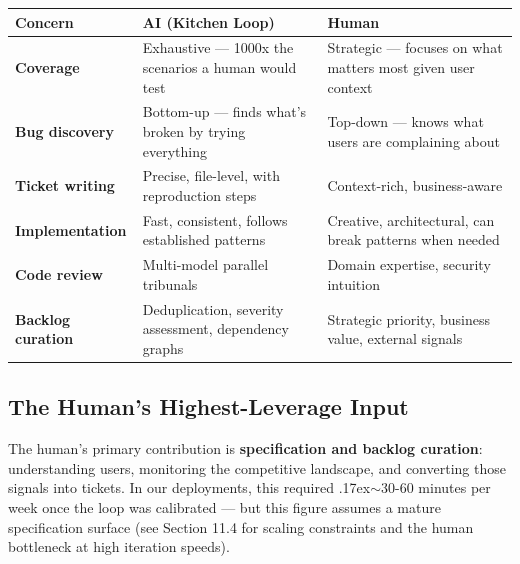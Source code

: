 \documentclass[11pt,a4paper]{article}
\newcounter{none} %
\newcommand{\roughly}{{\textraisebox{.17ex}{$\scriptstyle\sim$}}}
\newcommand{\textraisebox}[2]{\leavevmode\raise#1\hbox{#2}}
\begin{document}
{\def\LTcaptype{none} %
\begin{longtable}[]{@{}
  >{\raggedright\arraybackslash}p{}
  >{\raggedright\arraybackslash}p{}
  >{\raggedright\arraybackslash}p{}@{}}
\toprule\noalign{}
\begin{minipage}[b]{\linewidth}\raggedright
Concern
\end{minipage} & \begin{minipage}[b]{\linewidth}\raggedright
AI (Kitchen Loop)
\end{minipage} & \begin{minipage}[b]{\linewidth}\raggedright
Human
\end{minipage} \\
\midrule\noalign{}
\endhead
\bottomrule\noalign{}
\endlastfoot
\textbf{Coverage} & Exhaustive --- 1000x the scenarios a human would test & Strategic --- focuses on what matters most given user context \\
\textbf{Bug discovery} & Bottom-up --- finds what's broken by trying everything & Top-down --- knows what users are complaining about \\
\textbf{Ticket writing} & Precise, file-level, with reproduction steps & Context-rich, business-aware \\
\textbf{Implementation} & Fast, consistent, follows established patterns & Creative, architectural, can break patterns when needed \\
\textbf{Code review} & Multi-model parallel tribunals & Domain expertise, security intuition \\
\textbf{Backlog curation} & Deduplication, severity assessment, dependency graphs & Strategic priority, business value, external signals \\
\end{longtable}
}

\subsection{The Human's Highest-Leverage Input}\label{sec:humans-highest-leverage-input}

The human's primary contribution is \textbf{specification and backlog curation}: understanding users, monitoring the competitive landscape, and converting those signals into tickets. In our deployments, this required \roughly30-60 minutes per week once the loop was calibrated --- but this figure assumes a mature specification surface (see Section 11.4 for scaling constraints and the human bottleneck at high iteration speeds).
\end{document}
